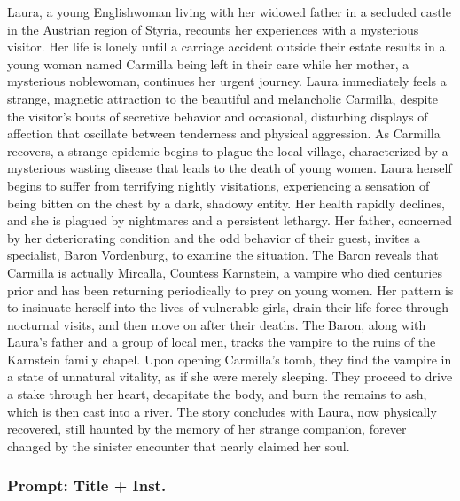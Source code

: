 \documentclass{article} %
\begin{document}
Laura, a young Englishwoman living with her widowed father in a secluded castle in the Austrian region of Styria, recounts her experiences with a mysterious visitor. Her life is lonely until a carriage accident outside their estate results in a young woman named Carmilla being left in their care while her mother, a mysterious noblewoman, continues her urgent journey. Laura immediately feels a strange, magnetic attraction to the beautiful and melancholic Carmilla, despite the visitor's bouts of secretive behavior and occasional, disturbing displays of affection that oscillate between tenderness and physical aggression. As Carmilla recovers, a strange epidemic begins to plague the local village, characterized by a mysterious wasting disease that leads to the death of young women. Laura herself begins to suffer from terrifying nightly visitations, experiencing a sensation of being bitten on the chest by a dark, shadowy entity. Her health rapidly declines, and she is plagued by nightmares and a persistent lethargy. Her father, concerned by her deteriorating condition and the odd behavior of their guest, invites a specialist, Baron Vordenburg, to examine the situation. The Baron reveals that Carmilla is actually Mircalla, Countess Karnstein, a vampire who died centuries prior and has been returning periodically to prey on young women. Her pattern is to insinuate herself into the lives of vulnerable girls, drain their life force through nocturnal visits, and then move on after their deaths. The Baron, along with Laura’s father and a group of local men, tracks the vampire to the ruins of the Karnstein family chapel. Upon opening Carmilla's tomb, they find the vampire in a state of unnatural vitality, as if she were merely sleeping. They proceed to drive a stake through her heart, decapitate the body, and burn the remains to ash, which is then cast into a river. The story concludes with Laura, now physically recovered, still haunted by the memory of her strange companion, forever changed by the sinister encounter that nearly claimed her soul.

\subsubsection{Prompt: Title + Inst.}
\end{document}
